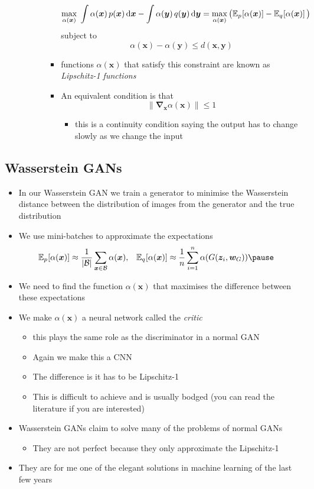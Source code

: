 \documentclass[11pt]{article}
\newcommand{\grad}{\bm{\nabla}}
\newcommand{\av}[2][]{\mathbb{E}_{#1\!}\left[ #2 \right]}
\newcommand{\dd}{\mathrm{d}}
\begin{document}
\begin{itemize}
\begin{itemize}
\begin{itemize}
\begin{itemize}
$$ \max_{\alpha(\bm{x})} \; \int
           \alpha(\bm{x})\,p(\bm{x})\, \dd \bm{x} - \int 
           \alpha(\bm{y})\,q(\bm{y})\,\dd \bm{y} =
           \max_{\alpha(\bm{x})} \left( \av[p]{\alpha(\bm{x})} -
           \av[q]{\alpha(\bm{x})} \strut \right) $$
subject to
$$ \alpha(\bm{x}) - \alpha(\bm{y}) \leq d(\bm{x},\bm{y}) $$
\item functions \(\alpha(\bm{x})\) that satisfy this constraint are
known as \emph{Lipschitz-1 functions}
\item An equivalent condition is that
$$ \| \grad_{\bm{x}} \alpha(\bm{x}) \| \leq 1 $$
\begin{itemize}
\item this is a continuity condition saying the output has to
change slowly as we change the input
\end{itemize}
\end{itemize}
\end{itemize}
\end{itemize}
\end{itemize}

\subsection{Wasserstein GANs}
\label{sec:orgb8095a9}
\begin{itemize}
\item In our Wasserstein GAN we train a generator to minimise the
Wasserstein distance between the distribution of images from the
generator and the true distribution
\item We use mini-batches to approximate the expectations
  \begin{align*}
   \av[p]{\alpha(\bm{x})}
  &\approx \frac{1}{|\mathcal{B}|}
    \sum_{\bm{x}\in\mathcal{B}} \alpha(\bm{x}),
  &
    \av[q]{\alpha(\bm{x})}
  &\approx \frac{1}{n} \sum_{i=1}^n
    \alpha(G(\bm{z}_i,\bm{w}_G))\pause
\end{align*}
\item We need to find the function \(\alpha(\bm{x})\) that maximises the
difference between these expectations
\item We make \(\alpha(\bm{x})\) a neural network called the \emph{critic}
\begin{itemize}
\item this plays the same role as the discriminator in a normal GAN
\item Again we make this a CNN
\item The difference is it has to be Lipschitz-1
\item This is difficult to achieve and is usually bodged (you can
read the literature if you are interested)
\end{itemize}
\item Wasserstein GANs claim to solve many of the problems of normal
GANs
\begin{itemize}
\item They are not perfect because they only approximate the
Lipschitz-1
\end{itemize}
\item They are for me one of the elegant solutions in machine learning
of the last few years
\end{itemize}
\end{document}
